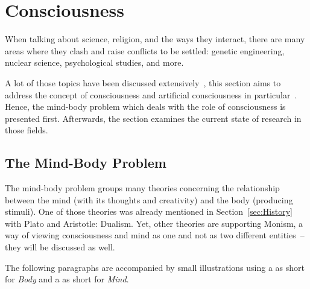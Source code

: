 \section{Consciousness}
\label{sec:Consciousness}

When talking about science, religion, and the ways they interact, there are many areas where they clash and raise conflicts to be settled: genetic engineering, nuclear science, psychological studies, and more.

A lot of those topics have been discussed extensively~\cite{barbour1993ethics,pfleiderer2010genethics,chernus1991nuclear}, this section aims to address the concept of consciousness and artificial consciousness in particular~\cite{buttazzo2001artificial,chella2013artificial}.
Hence, the mind-body problem which deals with the role of consciousness is presented first.
Afterwards, the section examines the current state of research in those fields. %

\def\lmibop#1{\texttt{[image: figures/asq\_mibop\_\#1-compressed.pdf]}}

\newcommand*\moppreview[2]{\needspace{3\baselineskip}\paragraph[#2]{\smash{\raisebox{-2.3\baselineskip}{\lmibop{#1}}} #2}%
\parshape=4
0cm \linewidth
1.65cm \dimexpr\linewidth-1.65cm\relax
1.5cm \dimexpr\linewidth-1.5cm\relax
0cm \linewidth}

\subsection{The Mind-Body Problem}
\label{subsec:mind-body}The mind-body problem groups many theories concerning the relationship between the mind (with its thoughts and creativity) and the body (producing stimuli).
One of those theories was already mentioned in Section~\ref{sec:History} with Plato and Aristotle: Dualism.
Yet, other theories are supporting Monism, a way of viewing consciousness and mind as one and not as two different entities~-- they will be discussed as well.

The following paragraphs are accompanied by small illustrations using a  as short for \emph{Body} and a  as short for \emph{Mind}.


